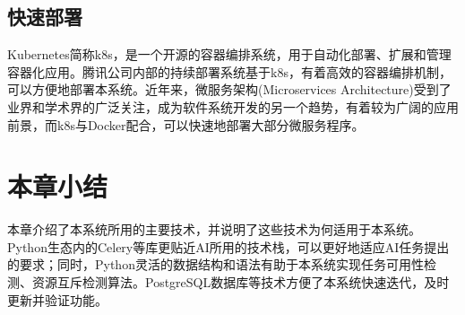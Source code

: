 \subsection{快速部署}

Kubernetes简称k8s，是一个开源的容器编排系统，用于自动化部署、扩展和管理容器化应用\cite{8}。腾讯公司内部的持续部署系统基于k8s，有着高效的容器编排机制，可以方便地部署本系统。近年来，微服务架构(Microservices Architecture)受到了业界和学术界的广泛关注，成为软件系统开发的另一个趋势，有着较为广阔的应用前景\cite{7, 25}，而k8s与Docker配合，可以快速地部署大部分微服务程序。

\section{本章小结}

本章介绍了本系统所用的主要技术，并说明了这些技术为何适用于本系统。Python生态内的Celery等库更贴近AI所用的技术栈，可以更好地适应AI任务提出的要求；同时，Python灵活的数据结构和语法有助于本系统实现任务可用性检测、资源互斥检测算法。PostgreSQL数据库等技术方便了本系统快速迭代，及时更新并验证功能。

\makeatletter
\@openrightfalse
\makeatother